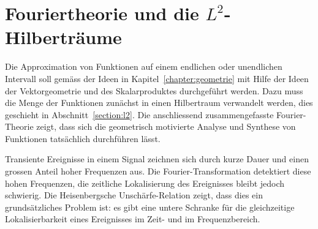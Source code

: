 %
%
%
\chapter{Fouriertheorie und die $L^2$-Hilberträume
\label{chapter:fourier}}
Die Approximation von Funktionen auf einem endlichen oder unendlichen
Intervall soll gemäss der Ideen in Kapitel~\ref{chapter:geometrie}
mit Hilfe der Ideen der Vektorgeometrie und des Skalarproduktes
durchgeführt werden.
Dazu muss die Menge der Funktionen zunächst in einen Hilbertraum
verwandelt werden, dies geschieht in Abschnitt~\ref{section:l2}.
Die anschliessend zusammengefasste Fourier-Theorie zeigt, dass sich
die geometrisch motivierte Analyse und Synthese von Funktionen
tatsächlich durchführen lässt.

Transiente Ereignisse in einem Signal zeichnen sich durch kurze Dauer
und einen grossen Anteil hoher Frequenzen aus.
Die Fourier-Transformation detektiert diese hohen Frequenzen, die
zeitliche Lokalisierung des Ereignisses bleibt jedoch schwierig.
Die Heisenbergsche Unschärfe-Relation zeigt, dass dies ein grundsätzliches
Problem ist: es gibt eine untere Schranke für die gleichzeitige
Lokalisierbarkeit eines Ereignisses im Zeit- und im Frequenzbereich.






